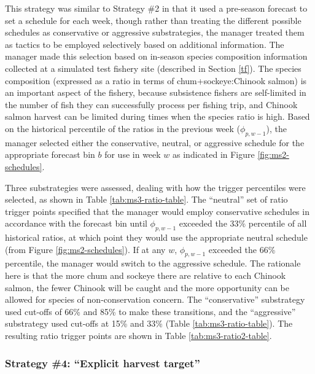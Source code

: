 \documentclass[12pt,]{book}
\theoremstyle{definition}
\theoremstyle{definition}
\theoremstyle{definition}
\theoremstyle{remark}
\begin{document}
\noindent
This strategy was similar to Strategy \#2 in that it used a pre-season
forecast to set a schedule for each week, though rather than treating
the different possible schedules as conservative or aggressive
substrategies, the manager treated them as tactics to be employed
selectively based on additional information. The manager made this
selection based on in-season species composition information collected
at a simulated test fishery site (described in Section \ref{tf}). The
species composition (expressed as a ratio in terms of
chum+sockeye:Chinook salmon) is an important aspect of the fishery,
because subsistence fishers are self-limited in the number of fish they
can successfully process per fishing trip, and Chinook salmon harvest
can be limited during times when the species ratio is high. Based on the
historical percentile of the ratios in the previous week
(\(\phi_{p,w-1}\)), the manager selected either the conservative,
neutral, or aggressive schedule for the appropriate forecast bin \(b\)
for use in week \(w\) as indicated in Figure \ref{fig:ms2-schedules}.

Three substrategies were assessed, dealing with how the trigger
percentiles were selected, as shown in Table \ref{tab:ms3-ratio-table}.
The ``neutral'' set of ratio trigger points specified that the manager
would employ conservative schedules in accordance with the forecast bin
until \(\phi_{p,w-1}\) exceeded the 33\% percentile of all historical
ratios, at which point they would use the appropriate neutral schedule
(from Figure \ref{fig:ms2-schedules}). If at any \(w\), \(\phi_{p,w-1}\)
exceeded the 66\% percentile, the manager would switch to the aggressive
schedule. The rationale here is that the more chum and sockeye there are
relative to each Chinook salmon, the fewer Chinook will be caught and
the more opportunity can be allowed for species of non-conservation
concern. The ``conservative'' substrategy used cut-offs of 66\% and 85\%
to make these transitions, and the ``aggressive'' substrategy used
cut-offs at 15\% and 33\% (Table \ref{tab:ms3-ratio-table}). The
resulting ratio trigger points are shown in Table
\ref{tab:ms3-ratio2-table}.

\subsubsection{\texorpdfstring{Strategy \#4: ``Explicit harvest
target''}{Strategy \#4: Explicit harvest target}}\label{strategy-4-explicit-harvest-target}
\end{document}
